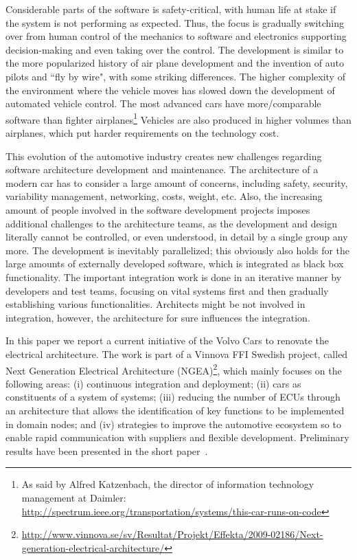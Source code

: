 \documentclass[preprint,12pt,3p]{elsarticle}
\begin{document}
Considerable parts of the
software is safety-critical, with human life at stake if the system is not performing as
expected. Thus, the focus is gradually switching over from human control of the
mechanics to software and electronics supporting decision-making and even taking
over the control. 
The development is similar to the more popularized history of
air plane development and the invention of auto pilots and ``fly by wire", with
some striking differences. The higher complexity of the environment where the
vehicle moves has slowed down the development of automated vehicle control. The
most advanced cars have more/comparable software than fighter
airplanes\footnote{As said by Alfred Katzenbach, the director of information technology management at Daimler: \url{http://spectrum.ieee.org/transportation/systems/this-car-runs-on-code}}
Vehicles are also produced in higher volumes than airplanes, which put harder requirements on the technology cost.

This evolution of the automotive industry %
creates new challenges regarding software
architecture development and maintenance. 
The architecture of a modern car has to consider a large amount of concerns, including safety, security, variability management, networking, costs, weight, etc.
Also, the increasing amount of people
involved in the software development projects imposes additional challenges to the
architecture teams, as the development and design literally cannot be
controlled, or even understood, in detail by a single group any more. The
development is inevitably parallelized; this obviously also holds for the large
amounts of externally developed software, which is integrated as black box
functionality. The important integration work is done in an iterative manner by
developers and test teams, focusing on vital systems first and then gradually
establishing various functionalities. Architects might be not involved in integration, 
however, the architecture for sure influences the integration.

In this paper we report a current initiative of the Volvo Cars to renovate the
electrical architecture. 
The work is part of a Vinnova FFI Swedish project, called Next Generation Electrical Architecture
 (NGEA)\footnote{\small{\url{http://www.vinnova.se/sv/Resultat/Projekt/Effekta/2009-02186/Next-generation-electrical-architecture/}}},
which mainly focuses on the following areas: (i) continuous integration and deployment; (ii)
cars as constituents of a system of systems; (iii) reducing the number of ECUs through an architecture that allows the identification of key functions to be implemented in domain nodes; and (iv) strategies to improve the automotive ecosystem so to enable rapid communication with suppliers and flexible development. Preliminary results have been presented in the short paper~\cite{WasaPaper}.
\end{document}
